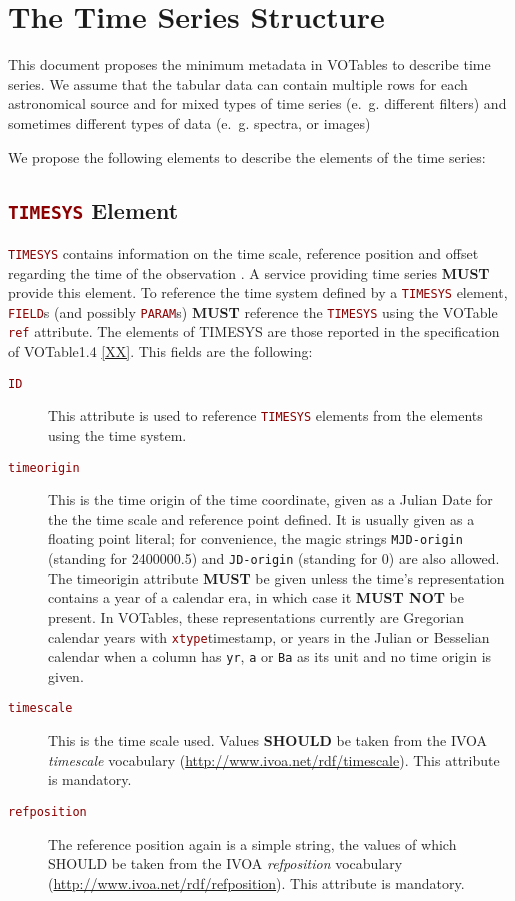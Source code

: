 \documentclass[11pt,a4paper]{ivoa}
\newcommand\elem[1]{\textcolor{DarkRed}{{\tt#1}}}
\begin{document}

\section{The Time Series Structure}
\label{elem:TIMESERIES}
This document proposes the minimum metadata in VOTables to describe time series. We assume that the tabular data can contain multiple rows for each astronomical source and for mixed types of time series (e.~g. different filters) and sometimes different types of data (e.~g. spectra, or images)

We propose the following elements to describe the elements of the time series: 

\subsection{\elem{TIMESYS} Element}
\elem{TIMESYS} contains information on the time scale, reference position and offset regarding the time of the observation \cite{VOTable1.4, TIMESYS}. A service providing time series \textbf{MUST} provide this element. To reference the time system defined by a \elem{TIMESYS} element, \elem{FIELD}s (and possibly \elem{PARAM}s) \textbf{MUST} reference the \elem{TIMESYS} using the VOTable \elem{ref} attribute. The elements of TIMESYS are those reported in the specification of VOTable1.4 \ref{XX}. This fields are the following: 

\begin{description}
   \item[\elem{ID}] This attribute is used to reference \elem{TIMESYS} elements from the elements using the time system.
   \item[\elem{timeorigin}] This is the time origin of the time coordinate, given as a Julian Date for the the time scale and reference point
defined.  It is usually given as a floating point literal; for convenience, the magic strings \verb|MJD-origin| (standing
for 2400000.5) and \verb|JD-origin| (standing for 0) are also allowed. The timeorigin attribute \textbf{MUST} be given unless the time's representation contains a year of a calendar era, in which case it \textbf{MUST NOT} be present. In VOTables, these representations currently are Gregorian calendar years with \elem{xtype}{timestamp}, or years in the Julian or Besselian calendar when a column has \verb|yr|, \verb|a| or \verb|Ba| as its unit and no time origin is given. 
   \item[\elem{timescale}] This is the time scale used. Values \textbf{SHOULD} be taken from the IVOA \emph{timescale} vocabulary (\url{http://www.ivoa.net/rdf/timescale}). This attribute is mandatory.
   \item[\elem{refposition}] The reference position again is a simple string, the values of which SHOULD be taken from the IVOA \emph{refposition} vocabulary (\url{http://www.ivoa.net/rdf/refposition}). This attribute is mandatory.
\end{description}
  
\end{document}
